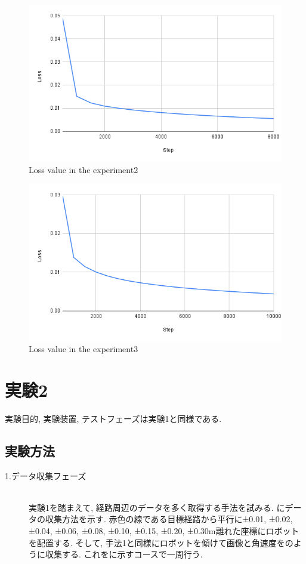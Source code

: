 \begin{figure}[h]
  \centering
  \includegraphics[keepaspectratio, scale=0.31]{images/exp1.2_8000.png}
  \caption{Loss value in the experiment2}
  \label{Fig:exp1.2_8000}
  \end{figure}

\begin{figure}[h]
  \centering
  \includegraphics[keepaspectratio, scale=0.31]{images/exp1.2_10000.png}
  \caption{Loss value in the experiment3}
  \label{Fig:exp1.2_10000}
  \end{figure}

\newpage
\section{実験2}
実験目的, 実験装置, テストフェーズは実験1と同様である.
\subsection{実験方法}
\begin{description}
  \item[1.データ収集フェーズ]\mbox{}\\実験1を踏まえて, 経路周辺のデータを多く取得する手法を試みる. にデータの収集方法を示す. 赤色の線である目標経路から平行に±0.01, ±0.02, ±0.04, ±0.06, ±0.08, ±0.10, ±0.15, ±0.20, ±0.30m離れた座標にロボットを配置する. そして, 手法1と同様にロボットを傾けて画像と角速度をのように収集する. これをに示すコースで一周行う.  
\end{description}

